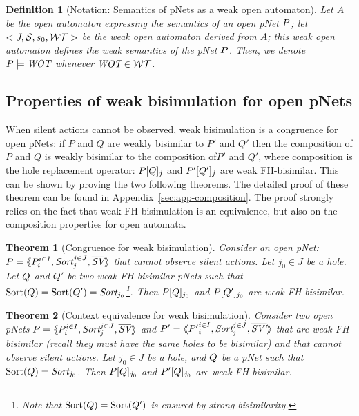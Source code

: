 \documentclass{lmcs}
\newtheorem{theorem}{Theorem}
\newtheorem{definition}{Definition}
\begin{document}
\begin{definition}[Notation: Semantics of pNets as a weak open automaton]
Let $A$ be the open automaton expressing the semantics of an open pNet $P$; let $<J,\mathcal{S},s_0,  \mathcal{WT}>$ be the weak open automaton derived from $A$; this weak open automaton defines the weak semantics of the pNet $P$. Then, we denote $\pNet \models \WOT$ whenever $\WOT\in\WT$.
\end{definition}


\subsection{Properties of weak bisimulation for open pNets}

When silent actions cannot be observed, weak bisimulation is a congruence for open pNets: if $P$ and $Q$ are weakly bisimilar to $P'$ and $Q'$ then the composition of $P$ and $Q$ is weakly bisimilar to the composition of$P'$ and $Q'$, where composition is the hole replacement operator: 	$P[Q]_{j}$ and 
	$P'[Q']_{j}$ are weak FH-bisimilar. This can be shown by proving the two following theorems.
The detailed proof of these theorem can be found in Appendix~\ref{sec:app-composition}. The proof strongly relies on the fact that weak FH-bisimulation is an equivalence, but also on the composition properties for open automata.

\begin{theorem}[Congruence for  weak bisimulation]\label{weak-thm-congr-eq}
	Consider an open pNet:
	$\pNet = \mylangle \pNet_i^{i\in I}, \Sort_j^{j\in J}, 
	\set{\symb{SV}}\myrangle$ that cannot observe silent actions.
	Let $j_0\in J$ be a hole. Let $Q$ and $Q'$ be two weak FH-bisimilar pNets such that 
	$\Sortop(\pNetQ)=\Sortop(\pNetQ')=\Sort_{j_0}$\footnote{Note that $\operatorname{Sort}(Q)=\operatorname{Sort}(Q')$ is 
	ensured by 
	strong bisimilarity.}. Then 
	$P[Q]_{j_0}$ and 
	$P[Q']_{j_0}$ are weak FH-bisimilar.
\end{theorem}

\begin{theorem}[Context equivalence for  weak bisimulation]\label{weak-thm-ctxt-eq}
	Consider two  open pNets
	$\pNet = \mylangle \pNet_i^{i\in I}, \Sort_j^{j\in J}, 
	\set{\symb{SV}}\myrangle$ and 	$\pNet' = \mylangle {\pNet'}_i^{i\in I}, 
	\Sort_j^{j\in 
	J}, 	\set{\symb{SV'}}\myrangle$ that are weak FH-bisimilar
	(recall they must have the same holes to be bisimilar) and that cannot observe silent actions.
	Let $j_0\in J$ be a hole, and $Q$ be a pNet such that $\Sortop(\pNetQ)=\Sort_{j_0}$. Then 
	$P[Q]_{j_0}$ and 
	$P'[Q]_{j_0}$ are weak FH-bisimilar.
\end{theorem}
\end{document}
